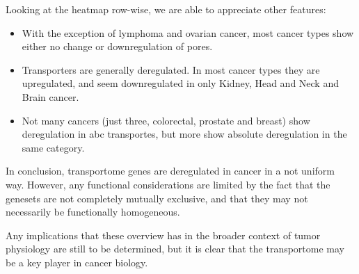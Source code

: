 Looking at the heatmap row-wise, we are able to appreciate other features:
\begin{itemize}
    \item With the exception of lymphoma and ovarian cancer, most cancer types show either no change or downregulation of pores.
    \item Transporters are generally deregulated.
    In most cancer types they are upregulated, and seem downregulated in only Kidney, Head and Neck and Brain cancer.
    \item Not many cancers (just three, colorectal, prostate and breast) show deregulation in \gls{abc} transportes, but more show absolute deregulation in the same category.
\end{itemize}

In conclusion, transportome genes are deregulated in cancer in a not uniform way.
However, any functional considerations are limited by the fact that the genesets are not completely mutually exclusive, and that they may not necessarily be functionally homogeneous.

Any implications that these overview has in the broader context of tumor physiology are still to be determined, but it is clear that the transportome may be a key player in cancer biology.
